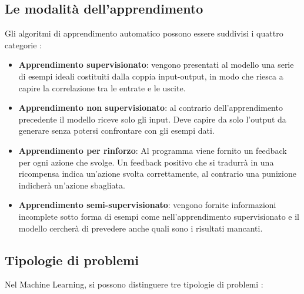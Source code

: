 \subsection{Le modalità dell’apprendimento}
Gli algoritmi di apprendimento automatico possono essere suddivisi i quattro categorie 
\cite{I_3_PROBLEMI_ML_e_APPRENDIMENTO, ASPETTI_ML}:
\begin{itemize}
    \item \textbf{Apprendimento supervisionato}: vengono presentati al modello una
    serie di esempi ideali costituiti dalla coppia input-output, in modo che
    riesca a capire la correlazione tra le entrate e le uscite.

    \item \textbf{Apprendimento non supervisionato}: al contrario dell’apprendimento
    precedente il modello riceve solo gli input. Deve capire da solo l’output
    da generare senza potersi confrontare con gli esempi dati.

    \item \textbf{Apprendimento per rinforzo}: Al programma viene fornito 
    un feedback per ogni azione che svolge. Un feedback positivo
    che si tradurrà in una ricompensa indica un’azione svolta correttamente,
    al contrario una punizione indicherà un’azione sbagliata.
    
    \item \textbf{Apprendimento semi-supervisionato}: vengono fornite informazioni
    incomplete sotto forma di esempi come nell’apprendimento supervisionato
    e il modello cercherà di prevedere anche quali sono i risultati mancanti.
\end{itemize}

\newpage
\subsection{Tipologie di problemi}
Nel Machine Learning, si possono distinguere tre tipologie di problemi
\cite{I_3_PROBLEMI_ML_e_APPRENDIMENTO, ASPETTI_ML}:

